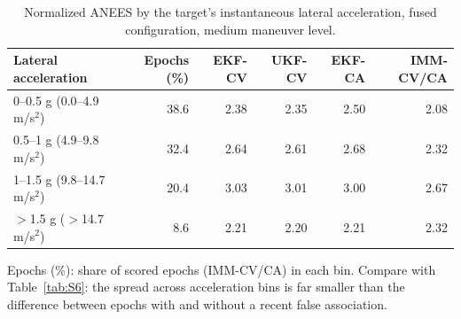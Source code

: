 \begin{table}[!htbp]
\caption{Normalized ANEES by the target's instantaneous lateral acceleration, fused configuration, medium maneuver level.}
\label{tab:S7}
\centering\footnotesize\setlength{\tabcolsep}{5pt}
\begin{tabular}{@{}lrrrrr@{}}
\toprule
Lateral acceleration & Epochs (\%) & EKF-CV & UKF-CV & EKF-CA & IMM-CV/CA \\
\midrule
0--0.5 g (0.0--4.9 m/s$^2$) & 38.6 & 2.38 & 2.35 & 2.50 & 2.08 \\
0.5--1 g (4.9--9.8 m/s$^2$) & 32.4 & 2.64 & 2.61 & 2.68 & 2.32 \\
1--1.5 g (9.8--14.7 m/s$^2$) & 20.4 & 3.03 & 3.01 & 3.00 & 2.67 \\
$>$1.5 g ($>$14.7 m/s$^2$) & 8.6 & 2.21 & 2.20 & 2.21 & 2.32 \\
\bottomrule
\end{tabular}

\smallskip
\parbox{\textwidth}{\footnotesize Epochs (\%): share of scored epochs (IMM-CV/CA) in each bin. Compare with Table~\ref{tab:S6}: the spread across acceleration bins is far smaller than the difference between epochs with and without a recent false association.}
\end{table}
